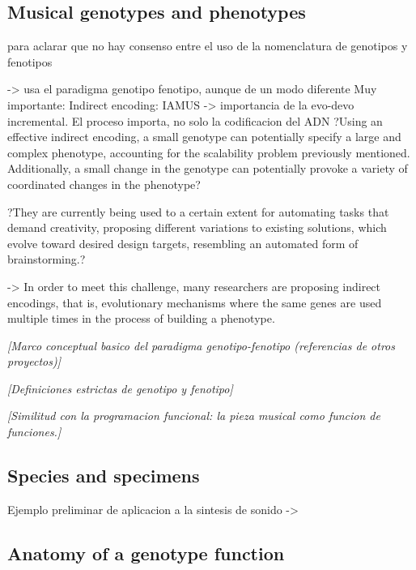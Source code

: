 \documentclass{article}
\begin{document}
\subsection{Musical genotypes and phenotypes}

{\color{red}


para aclarar que no hay consenso entre el uso de la nomenclatura de genotipos y fenotipos \cite{Sulyok2019}

\cite{SnchezQuintana2013} -> usa el paradigma genotipo fenotipo, aunque de un modo diferente
Muy importante: Indirect encoding: IAMUS -> importancia de la evo-devo incremental. El proceso importa, no solo la codificacion del ADN
?Using an effective indirect encoding, a small
genotype can potentially specify a large and complex
phenotype, accounting for the scalability problem
previously mentioned. Additionally, a small change
in the genotype can potentially provoke a variety of
coordinated changes in the phenotype?

?They are currently
being used to a certain extent for automating
tasks that demand creativity, proposing different
variations to existing solutions, which evolve toward
desired design targets, resembling an automated form
of brainstorming.?


\cite{stanley:alife03} -> In order to meet this
challenge, many researchers are proposing indirect
encodings, that is, evolutionary mechanisms where the same
genes are used multiple times in the process of building a
phenotype.

}

{\color{gray} \textsl{[Marco conceptual basico del paradigma genotipo-fenotipo (referencias de otros proyectos)]}}

{\color{gray} \textsl{[Definiciones estrictas de genotipo y fenotipo]}}


{\color{gray} \textsl{[Similitud con la programacion funcional: la pieza musical como funcion de funciones.]}}

\subsection{Species and specimens}


{\color{red}

Ejemplo preliminar de aplicacion a la sintesis de sonido -> \cite{microcontrapunctus}
}


\subsection{Anatomy of a genotype function}
\end{document}
